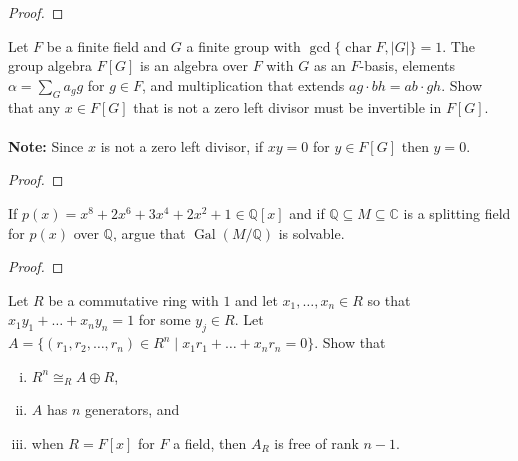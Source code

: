 \documentclass{article}
\newenvironment{problem}[2][Problem]{\begin{trivlist}
\item[\hskip \labelsep {\bfseries #1}\hskip \labelsep {\bfseries #2.}]}{\end{trivlist}}
\newcommand{\Q}{\mathbb Q}
\newcommand{\C}{\mathbb C}
\newcommand{\set}[1]{\{#1\}}
\newcommand{\Gal}{\operatorname{Gal}}
\begin{document}
\begin{proof}
\end{proof}
\pagebreak

\begin{problem}{3}
  Let $F$ be a finite field and $G$ a finite group with
  $\gcd\set{\operatorname{char} F, |G|} = 1.$ The group algebra $F[G]$ is an
  algebra over $F$ with $G$ as an $F$-basis, elements $\alpha = \sum_G a_gg$ for
  $g \in F$, and multiplication that extends $ag \cdot bh = ab \cdot gh$.
  Show that any $x \in F[G]$ that is not a zero left divisor must be invertible
  in $F[G]$.
  \\~\\
  \textbf{Note:} Since $x$ is not a zero left divisor, if $xy = 0$ for
  $y \in F[G]$ then $y=0$.
\end{problem}

\begin{proof}
\end{proof}
\pagebreak

\begin{problem}{4}
  If $p(x) = x^8 + 2x^6 + 3x^4 + 2x^2 + 1 \in \Q[x]$ and if
  $\Q \subseteq M \subseteq \C$ is a splitting field for $p(x)$ over $\Q$,
  argue that $\Gal(M/\Q)$ is solvable.
\end{problem}

\begin{proof}
\end{proof}
\pagebreak

\begin{problem}{5}
  Let $R$ be a commutative ring with $1$ and let $x_1, \hdots, x_n \in R$
  so that $x_1y_1 + \hdots + x_ny_n = 1$ for some $y_j \in R$. Let
  $A = \set{(r_1, r_2, \hdots, r_n) \in R^n \mid x_1r_1 + \hdots + x_nr_n = 0}.$
  Show that \begin{enumerate}[(i)]
    \item $R^n \cong_R A \oplus R$,
    \item $A$ has $n$ generators, and
    \item when $R = F[x]$ for $F$ a field, then $A_R$ is free of rank $n-1$.
  \end{enumerate}
\end{problem}
\end{document}
